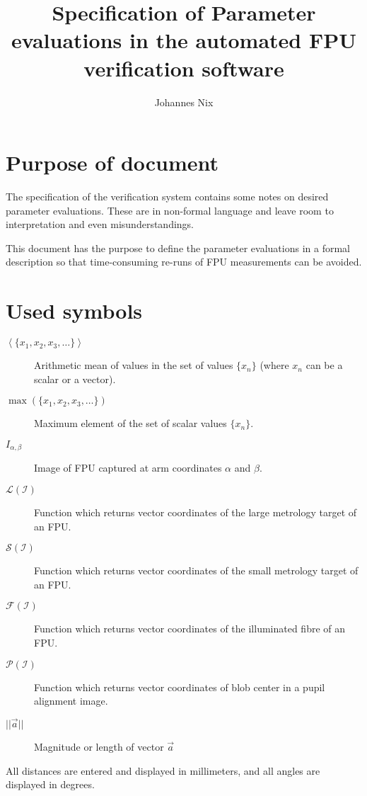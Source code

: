 \documentclass[11pt,a4paper]{scrartcl}
\begin{document}
\title{Specification of Parameter evaluations in the automated FPU verification software}

\author{Johannes Nix}

\maketitle
\tableofcontents

\section{Purpose of document}

The specification of the verification system contains some notes on
desired parameter evaluations. These are in non-formal language
and leave room to interpretation and even misunderstandings.

This document has the purpose to define the parameter evaluations in a
formal description so that time-consuming re-runs of FPU measurements
can be avoided.

\section{Used symbols}
\begin{description}
\item[$ \left< \{ x_1, x_2, x_3, \ldots \} \right> $] Arithmetic
  mean of values in the set of values $\{ x_n \} $ (where
  $x_n$ can be a scalar or a vector).
\item[$\max(\{x_1, x_2, x_3, \ldots \})$] Maximum element of
  the set of scalar values $\{ x_n \}$.
\item[$I_{\alpha,\beta}$] Image of FPU captured at arm coordinates
  $\alpha$ and $\beta$.
\item[$\mathcal{L(I)}$] Function which returns vector coordinates of
  the large metrology target of an FPU.
\item[$\mathcal{S(I)}$] Function which returns vector coordinates of
  the small metrology target of an FPU.
\item[$\mathcal{F(I)}$] Function which returns vector coordinates of
  the illuminated fibre of an FPU.
\item[$\mathcal{P(I)}$] Function which returns vector coordinates of
  blob center in a pupil alignment image.
  \item[$||\vec{a}||$] Magnitude or length of vector $\vec{a}$
\end{description}

All distances are entered and displayed in millimeters, and all angles
are displayed in degrees.
\end{document}
